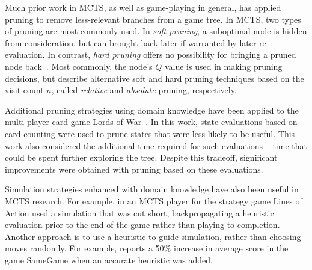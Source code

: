 \documentclass[letterpaper]{article}
\begin{document}
Much prior work in MCTS, as well as game-playing in general, has applied pruning to remove less-relevant branches from a game tree. In MCTS, two types of pruning are most commonly used. In {\it soft pruning}, a suboptimal node is hidden from consideration, but can brought back later if warranted by later re-evaluation. In contrast, {\it hard pruning} offers no possibility for bringing a pruned node back~\cite{browne2012survey}. Most commonly, the node's $Q$ value is used in making pruning decisions, but \cite{huang2010pruning} describe alternative soft and hard pruning techniques based on the visit count $n$, called {\it relative} and {\it absolute} pruning, respectively.

Additional pruning strategies using domain knowledge have been applied to the multi-player card game Lords of War~\cite{sephton2014ieee}. In this work, state evaluations based on card counting were used to prune states that were less likely to be useful. This work also considered the additional time required for such evaluations -- time that could be spent further exploring the tree. Despite this tradeoff, significant improvements were obtained with pruning based on these evaluations.

Simulation strategies enhanced with domain knowledge have also been useful in MCTS research. For example, in \cite{winands2010monte} an MCTS player for the strategy game Lines of Action used a simulation that was cut short, backpropagating a heuristic evaluation prior to the end of the game rather than playing to completion. Another approach is to use a heuristic to guide simulation, rather than choosing moves randomly. For example, \cite{schadd2012single} reports a 50\% increase in average score in the game SameGame when an accurate heuristic was added.

\end{document}
